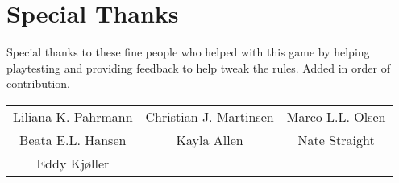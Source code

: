\section*{Special Thanks}
Special thanks to these fine people who helped with this game by helping playtesting and providing feedback to help tweak the rules.
Added in order of contribution.
\vspace{5mm}

\noindent\begin{tabular}{ccc}
    Liliana K. Pahrmann & Christian J. Martinsen & Marco L.L. Olsen\\ 
    Beata E.L. Hansen & Kayla Allen & Nate Straight\\
    Eddy Kjøller
\end{tabular}